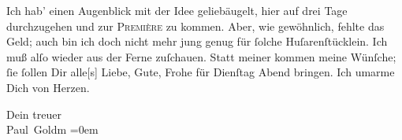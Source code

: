 \pstart
           Ich hab’ einen Augenblick mit der Idee geliebäugelt, hier auf drei Tage durchzugehen
               und zur \textsc{Première} zu kommen. Aber, wie gewöhnlich, fehlte
               das Geld; auch bin ich doch nicht mehr jung genug für{ }ſolche Huſarenſtücklein. Ich
               muß alſo wieder aus der Ferne zuſchauen. Statt meiner kommen meine Wünſche;{ }ſie{ }ſollen Dir alle{[}s{]} Liebe, Gute, Frohe für Dienſtag{ }Abend bringen. Ich umarme Dich von Herzen.\pend
           
\pstart
           Dein treuer {\\[\baselineskip]}\spacefill\mbox{Paul Goldm}\pend
           \leftskip=0em{}
\pstart
           \noindent{}\label{T_L02789-1v}\label{T_L02789-1}\pend
           \endnumbering{}  \newcommand{\dateiname}{L02789}\newcommand{\titel}{Paul Goldmann an Arthur Schnitzler, 1. 11. [1896]}\newcommand{\editorInnen}{Martin Anton Müller und Laura Untner}
